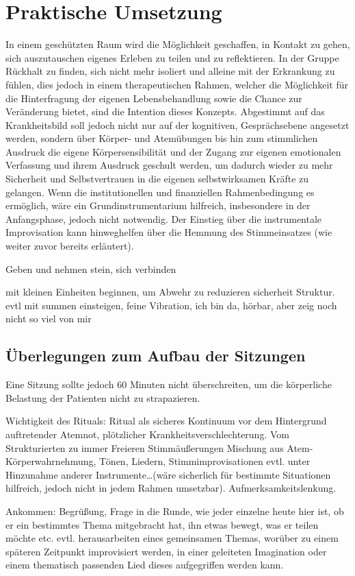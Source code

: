 \section{Praktische Umsetzung}
In einem geschützten Raum wird die Möglichkeit geschaffen, in Kontakt zu gehen, sich auszutauschen eigenes Erleben zu teilen und zu reflektieren. In der Gruppe Rückhalt zu finden, sich nicht mehr isoliert und alleine mit der Erkrankung zu fühlen, dies jedoch in einem therapeutischen Rahmen, welcher die Möglichkeit für die Hinterfragung der eigenen Lebensbehandlung sowie die Chance zur Veränderung bietet, sind die Intention dieses Konzepts. Abgestimmt auf das Krankheitsbild soll jedoch nicht nur auf der kognitiven, Gesprächsebene angesetzt werden, sondern über Körper- und Atemübungen bis hin zum stimmlichen Ausdruck die eigene Körpersensibilität und der Zugang zur eigenen emotionalen Verfassung und ihrem Ausdruck geschult werden, um dadurch wieder zu mehr Sicherheit und Selbstvertrauen in die eigenen selbstwirksamen Kräfte zu gelangen. Wenn die institutionellen und finanziellen Rahmenbedingung es ermöglich, wäre ein Grundinstrumentarium hilfreich, insbesondere in der Anfangsphase, jedoch nicht notwendig. Der Einstieg über die instrumentale Improvisation kann hinweghelfen über die Hemmung des Stimmeinsatzes (wie weiter zuvor bereits erläutert).  

Geben und nehmen stein, sich verbinden

mit kleinen Einheiten beginnen, um Abwehr zu reduzieren sicherheit Struktur. evtl mit summen einsteigen, feine Vibration, ich bin da, hörbar, aber zeig noch nicht so viel von mir


\subsection{Überlegungen zum Aufbau der Sitzungen}

Eine Sitzung sollte jedoch 60 Minuten nicht überschreiten, um die körperliche Belastung der Patienten nicht zu strapazieren.

Wichtigkeit des Rituals: Ritual als sicheres Kontinuum vor dem Hintergrund auftretender Atemnot, plötzlicher Krankheitsverschlechterung. 
Vom Strukturierten zu immer Freieren Stimmäußerungen
Mischung aus Atem- Körperwahrnehmung, Tönen, Liedern, Stimmimprovisationen evtl. unter Hinzunahme anderer Instrumente…(wäre sicherlich für bestimmte Situationen hilfreich, jedoch nicht in jedem Rahmen umsetzbar). 
Aufmerksamkeitslenkung. 

Ankommen: 
Begrüßung, Frage in die Runde, wie jeder einzelne heute hier ist, ob er ein bestimmtes Thema mitgebracht hat, ihn etwas bewegt, was er teilen möchte etc. evtl. herausarbeiten eines gemeinsamen Themas, worüber zu einem späteren Zeitpunkt improvisiert werden, in einer geleiteten Imagination oder einem thematisch passenden Lied dieses aufgegriffen werden kann.

